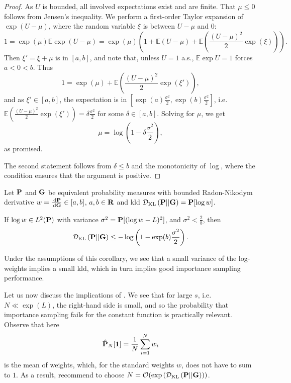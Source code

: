 \begin{proof}
    As $U$ is bounded, all involved expectations exist and are finite. That $\mu \leq 0$ follows from Jensen's inequality. We perform a first-order Taylor expansion of $\exp(U - \mu)$, where the random variable $\xi$ is between $U - \mu$ and $0$:
    $$
    1 = \exp(\mu)\mathbb E \exp (U - \mu) = \exp (\mu) \left( 1 + \mathbb E (U - \mu) + \mathbb E\left(\frac{(U-\mu)^{2}}{2} \exp(\xi)\right) \right).
    $$
    Then $\xi' = \xi + \mu$ is in $[a,b]$, and note that, unless $U = 1$ a.s., $\mathbb E \exp U = 1$ forces $a < 0 < b$. 
    Thus
    $$
    1 = \exp(\mu) + \mathbb E\left(\frac{(U-\mu)^{2}}{2} \exp(\xi')\right),
    $$
    and as $\xi' \in [a,b]$, the expectation is in $\left[\exp(a) \frac{\sigma^{2}}{2}, \exp(b) \frac{\sigma^{2}}{2}\right]$, i.e. $\mathbb E\left(\frac{(U-\mu)^{2}}{2} \exp(\xi')\right) = \delta \frac{\sigma^{2}}{2}$ for some $\delta \in [a,b]$. Solving for $\mu$, we get 
    $$
    \mu = \log \left( 1 - \delta \frac{\sigma^{2}}{2} \right),
    $$
    as promised.

    The second statement follows from $\delta \leq b$ and the monotonicity of $\log$, where the condition ensures that the argument is positive.
\end{proof}

\begin{corollary}
    Let $\P$ and $\G$ be equivalent probability measures with bounded Radon-Nikodym derivative $w = \frac{\d\P}{\d\G} \in [a,b]$, $a, b \in \R$ and \acrshort{kld} $\Dkl{\P}{\G} =\P [\log w]$.
    
    If $\log w \in L^{2}(\P)$ with variance $\sigma^{2} = \P [(\log w - L)^2]$, and $\sigma^{2} < \frac{2}{b}$, then 
    $$
    \Dkl{\P}{\G} \leq - \log \left(1 - \exp(b) \frac{\sigma^{2}}{2} \right).
    $$
\end{corollary}
Under the assumptions of this corollary, we see that a small variance of the log-weights implies a small \acrshort{kld}, which in turn implies good importance sampling performance.

Let us now discuss the implications of . We see that for large $s$, i.e. $N \ll \exp(L)$, the right-hand side is small, and so the probability that importance sampling fails for the constant function is practically relevant. Observe that here 
$$
\hat \P_{N} [\mathbf 1 ] = \frac{1}{N} \sum_{i = 1}^N w_{i}
$$
is the mean of weights, which, for the standard weights $w$, does not have to sum to $1$. 
As a result, \citeauthor{Chatterjee2018Sample} recommend to choose $N = \mathcal O( \exp \left( \Dkl{\P}{\G} \right))$. 

